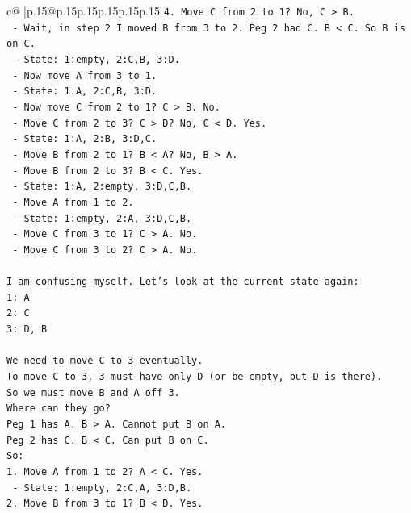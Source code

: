 \documentclass{article}
\begin{document}
{\begin{supertabular}{c@{$\;$}|p{.15\linewidth}@{}p{.15\linewidth}p{.15\linewidth}p{.15\linewidth}p{.15\linewidth}p{.15\linewidth}}
{{{\texttt{4. Move C from 2 to 1? No, C > B.} \\
\texttt{   {-} Wait, in step 2 I moved B from 3 to 2. Peg 2 had C. B < C. So B is on C.} \\
\texttt{   {-} State: 1:empty, 2:C,B, 3:D.} \\
\texttt{   {-} Now move A from 3 to 1.} \\
\texttt{   {-} State: 1:A, 2:C,B, 3:D.} \\
\texttt{   {-} Now move C from 2 to 1? C > B. No.} \\
\texttt{   {-} Move C from 2 to 3? C > D? No, C < D. Yes.} \\
\texttt{   {-} State: 1:A, 2:B, 3:D,C.} \\
\texttt{   {-} Move B from 2 to 1? B < A? No, B > A.} \\
\texttt{   {-} Move B from 2 to 3? B < C. Yes.} \\
\texttt{   {-} State: 1:A, 2:empty, 3:D,C,B.} \\
\texttt{   {-} Move A from 1 to 2.} \\
\texttt{   {-} State: 1:empty, 2:A, 3:D,C,B.} \\
\texttt{   {-} Move C from 3 to 1? C > A. No.} \\
\texttt{   {-} Move C from 3 to 2? C > A. No.} \\
\\ 
\texttt{I am confusing myself. Let's look at the current state again:} \\
\texttt{1: A} \\
\texttt{2: C} \\
\texttt{3: D, B} \\
\\ 
\texttt{We need to move C to 3 eventually.} \\
\texttt{To move C to 3, 3 must have only D (or be empty, but D is there).} \\
\texttt{So we must move B and A off 3.} \\
\texttt{Where can they go?} \\
\texttt{Peg 1 has A. B > A. Cannot put B on A.} \\
\texttt{Peg 2 has C. B < C. Can put B on C.} \\
\texttt{So:} \\
\texttt{1. Move A from 1 to 2? A < C. Yes.} \\
\texttt{   {-} State: 1:empty, 2:C,A, 3:D,B.} \\
\texttt{2. Move B from 3 to 1? B < D. Yes.} \\
}}}
\end{supertabular}}
\end{document}
